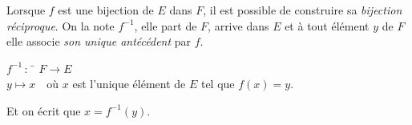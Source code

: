 \begin{exercice}[]
\begin{multicols}{2}
\begin{enumerate}
        \end{enumerate}    
    \end{multicols}
    
\end{exercice}

\begin{propriete}
    Lorsque $f$ est une bijection de $E$ dans $F$, il est possible de construire sa \textit{bijection réciproque}. On la note $f^{-1}$, elle part de $F$, arrive dans $E$ et à tout élément $y$ de $F$ elle associe \textit{son unique antécédent} par $f$.
    \begin{center}
        \begin{tabbing}
            $f^{-1}\,:\,$ \=	$F\longrightarrow E$\\
            \>	$y \longmapsto x$\ \ où $x$ est l'unique élément de $E$ tel que $f(x)=y$.
        \end{tabbing}
    \end{center}
    Et on écrit que $x=f^{-1}(y)$.\\
\end{propriete}

